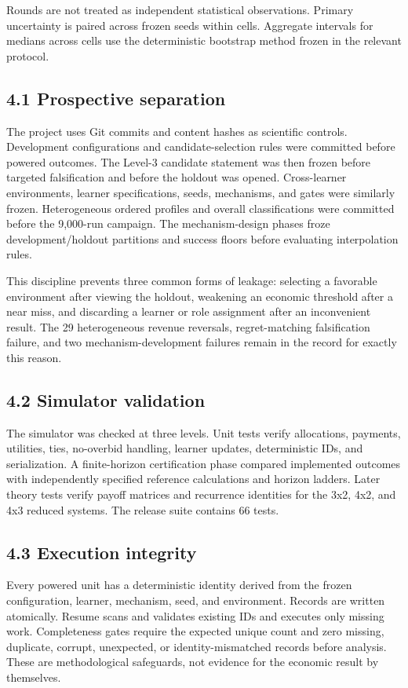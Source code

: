 \documentclass[11pt]{article}
\begin{document}
Rounds are not treated as independent statistical observations. Primary uncertainty is paired across frozen seeds within cells. Aggregate intervals for medians across cells use the deterministic bootstrap method frozen in the relevant protocol.

\subsection{4.1 Prospective separation}
The project uses Git commits and content hashes as scientific controls. Development configurations and candidate-selection rules were committed before powered outcomes. The Level-3 candidate statement was then frozen before targeted falsification and before the holdout was opened. Cross-learner environments, learner specifications, seeds, mechanisms, and gates were similarly frozen. Heterogeneous ordered profiles and overall classifications were committed before the 9,000-run campaign. The mechanism-design phases froze development/holdout partitions and success floors before evaluating interpolation rules.

This discipline prevents three common forms of leakage: selecting a favorable environment after viewing the holdout, weakening an economic threshold after a near miss, and discarding a learner or role assignment after an inconvenient result. The 29 heterogeneous revenue reversals, regret-matching falsification failure, and two mechanism-development failures remain in the record for exactly this reason.

\subsection{4.2 Simulator validation}
The simulator was checked at three levels. Unit tests verify allocations, payments, utilities, ties, no-overbid handling, learner updates, deterministic IDs, and serialization. A finite-horizon certification phase compared implemented outcomes with independently specified reference calculations and horizon ladders. Later theory tests verify payoff matrices and recurrence identities for the 3x2, 4x2, and 4x3 reduced systems. The release suite contains 66 tests.

\subsection{4.3 Execution integrity}
Every powered unit has a deterministic identity derived from the frozen configuration, learner, mechanism, seed, and environment. Records are written atomically. Resume scans and validates existing IDs and executes only missing work. Completeness gates require the expected unique count and zero missing, duplicate, corrupt, unexpected, or identity-mismatched records before analysis. These are methodological safeguards, not evidence for the economic result by themselves.
\end{document}
